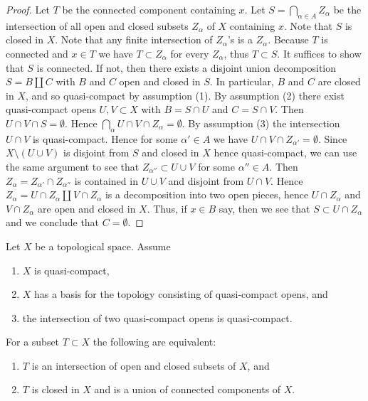 \begin{proof}
  Let $T$ be the connected component containing $x$. Let $S = \bigcap_{\alpha \in A} Z_\alpha$ be the intersection of all open and closed subsets $Z_\alpha$ of $X$ containing $x$. Note that $S$ is closed in $X$. Note that any finite intersection of $Z_\alpha$'s is a $Z_\alpha$. Because $T$ is connected and $x \in T$ we have $T \subset Z_\alpha$ for every \(Z_\alpha\), thus \(T \subset S\). It suffices to show that $S$ is connected. If not, then there exists a disjoint union decomposition $S = B \amalg C$ with $B$ and $C$ open and closed in $S$. In particular, $B$ and $C$ are closed in $X$, and so quasi-compact by assumption (1). By assumption (2) there exist quasi-compact opens $U, V \subset X$ with $B = S \cap U$ and $C = S \cap V$. Then $U \cap V \cap S = \emptyset$. Hence $\bigcap_\alpha U \cap V \cap Z_\alpha = \emptyset$. By assumption (3) the intersection $U \cap V$ is quasi-compact. Hence for some $\alpha' \in A$ we have $U \cap V \cap Z_{\alpha'} = \emptyset$. Since $X \setminus (U \cup V)$ is disjoint from $S$ and closed in $X$ hence quasi-compact, we can use the same argument to see that $Z_{\alpha''} \subset U \cup V$ for some $\alpha'' \in A$. Then $Z_\alpha = Z_{\alpha'} \cap Z_{\alpha''}$ is contained in $U \cup V$ and disjoint from $U \cap V$. Hence $Z_\alpha = U \cap Z_\alpha \amalg V \cap Z_\alpha$ is a decomposition into two open pieces, hence $U \cap Z_\alpha$ and $V \cap Z_\alpha$ are open and closed in $X$. Thus, if $x \in B$ say, then we see that $S \subset U \cap Z_\alpha$ and we conclude that $C = \emptyset$.
\end{proof}

\begin{lemma}
  \label{thm:intersection-closed-open-iff} %
  Let $X$ be a topological space. Assume
  \begin{enumerate}
    \item $X$ is quasi-compact,
    \item $X$ has a basis for the topology consisting of quasi-compact opens, and
    \item the intersection of two quasi-compact opens is quasi-compact.
  \end{enumerate}
  For a subset $T \subset X$ the following are equivalent:
  \begin{enumerate}
    \item $T$ is an intersection of open and closed subsets of $X$, and
    \item $T$ is closed in $X$ and is a union of connected components of $X$.
  \end{enumerate}
\end{lemma}

